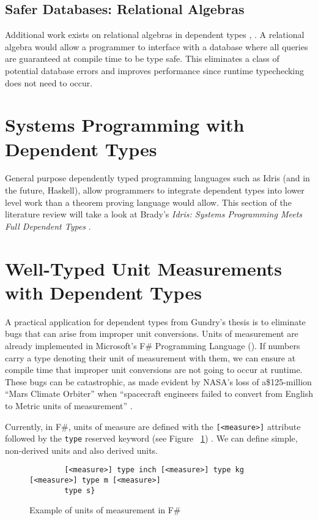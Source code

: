 \subsection{Safer Databases: Relational Algebras}

Additional work exists on relational algebras in dependent types
\cite{power_of_pi}, \cite{eisenberg2016}. A relational algebra would allow a
programmer to interface with a database where all queries are guaranteed at
compile time to be type safe. This eliminates a class of potential database
errors and improves performance since runtime typechecking does not need to
occur. 

\section{Systems Programming with Dependent Types}

General purpose dependently typed programming languages such as Idris (and in
the future, Haskell), allow programmers to integrate dependent types into lower
level work than a theorem proving language would allow. This section of the
literature review will take a look at Brady's \textit{Idris: Systems Programming
Meets Full Dependent Types} \cite{idris_systems_programming}.

\section{Well-Typed Unit Measurements with Dependent Types}

A practical application for dependent types from Gundry's thesis is to eliminate
bugs that can arise from improper unit conversions. Units of measurement are
already implemented in Microsoft's F\# Programming Language
(\cite{kennedy2009}). If numbers carry a type denoting their unit of measurement
with them, we can ensure at compile time that improper unit conversions are not
going to occur at runtime. These bugs can be catastrophic, as made evident by
NASA's loss of a\$125-million ``Mars Climate Orbiter'' when ``spacecraft
engineers failed to convert from English to Metric units of measurement''
\cite{hotz1999}. 

Currently, in F\#, units of measure are defined with the \texttt{[<measure>]}
attribute followed by the \texttt{type} reserved keyword (see Figure
~\ref{units_in_f_sharp}) \cite{f_sharp_units}. We can define simple, non-derived
units and also derived units. 

\begin{figure}
    \caption{Example of units of measurement in F\#}
    \label{units_in_f_sharp}
    \begin{lstlisting}
        [<measure>] type inch [<measure>] type kg [<measure>] type m [<measure>]
        type s}
    \end{lstlisting}
\end{figure}

